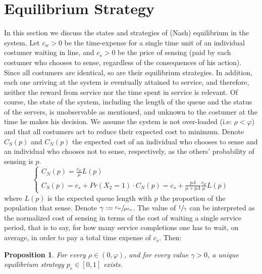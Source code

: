 \documentclass[11pt]{article}
\numberwithin{equation}{section}
\newtheorem{proposition}{Proposition}[section]
\begin{document}
\section{Equilibrium Strategy}
In this section we discuss the states and strategies of (Nash) equilibrium in the system. Let $c_{w}>0$ be the time-expense for a single time unit of an individual costumer waiting in line, and $c_{s}>0$ be the price of sensing (paid by each costumer who chooses to sense, regardless of the consequences of his action). Since all costumers are identical, so are their equilibrium strategies. In addition, each one arriving at the system is eventually attained to service, and therefore, neither the reward from service nor the time spent in service is relevant. Of course, the state of the system, including the length of the queue and the status of the servers, is unobservable as mentioned, and unknown to the costumer at the time he makes his decision. We assume the system is not over-loaded (i.e: $\rho<\varphi$) and that all costumers act to reduce their expected cost to minimum. Denote $C_{S}(p)$ and $C_{N}(p)$ the expected cost of an individual who chooses to sense and an individual who chooses not to sense, respectively, as the others' probability of sensing is $p$.
\begin{equation}\begin{cases}
 	C_{N}(p) = \frac{c_{w}}{\mu}L(p) \\
	C_{S}(p) = c_{s} + Pr(X_2=1) \cdot C_{N}(p) = c_{s} + \frac{p\Lambda}{\mu+p\Lambda}\frac{c_{w}}{\mu}L(p) 
\end{cases}
\label{LossFunc}
\end{equation}
where $L(p)$ is the expected queue length with $p$ the proportion of the population that sense. Denote $\gamma :=\sfrac{c_{w}}{\mu c_{s}}$. The value of $\sfrac{1}{\gamma}$ can be interpreted as the normalized cost of sensing in terms of the cost of waiting a single service period, that is to say, for how many service completions one has to wait, on average, in order to pay a total time expense of $c_{s}$. Then:

\begin{proposition} For every $\rho\in(0,\varphi)$, and for every value  $\gamma>0$, a unique equilibrium strategy $p_{e}\in[0,1]$ exists.
\end{proposition}
\end{document}
